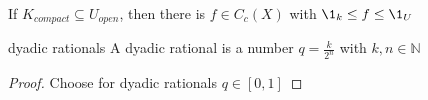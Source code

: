 \begin{lemma}
	If $K_{compact} \subseteq U_{open}$, then there is  $f \in C_{c} (X)$ with $\1_k \leq f \leq \1_U$
\end{lemma}

\begin{remark} dyadic rationals
		A dyadic rational is a number $q = \frac{k}{2^{n}}$ with $k,n \in \mathbb{N}$
\end{remark}

\begin{proof}
	Choose for dyadic rationals $q \in [0,1]$
\end{proof}
